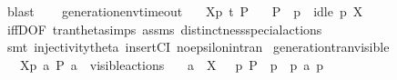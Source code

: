 \begin{isabellebody}
\ blast%
\endisatagproof
{\isafoldproof}%
%
\isadelimproof
\isanewline
%
\endisadelimproof
\ \ \isanewline
{}\isamarkupfalse%
\ generation{\isacharunderscore}{\kern0pt}env{\isacharunderscore}{\kern0pt}timeout{\isacharcolon}{\kern0pt}\isanewline
\ \ \ {\isacartoucheopen}{\isasymtheta}{\isacharbrackleft}{\kern0pt}X{\isacharbrackright}{\kern0pt}{\isacharparenleft}{\kern0pt}p{\isacharparenright}{\kern0pt}\ {\isasymlongmapsto}\isactrlsup {\isasymtheta}t{\isacharunderscore}{\kern0pt}{\isasymepsilon}\ P{\isacharprime}{\kern0pt}{\isacartoucheclose}\isanewline
\ \ \ {\isacartoucheopen}P{\isacharprime}{\kern0pt}\ {\isacharequal}{\kern0pt}\ {\isasymtheta}{\isacharparenleft}{\kern0pt}p{\isacharparenright}{\kern0pt}\ {\isasymand}\ idle\ p\ X{\isacartoucheclose}\isanewline
%
\isadelimproof
\ \ %
\endisadelimproof
%
\isatagproof
{}\isamarkupfalse%
\ iffD{}{\isacharbrackleft}{\kern0pt}OF\ tran{\isacharunderscore}{\kern0pt}theta{\isachardot}{\kern0pt}simps\ assms{\isacharbrackright}{\kern0pt}\ distinctness{\isacharunderscore}{\kern0pt}special{\isacharunderscore}{\kern0pt}actions\isanewline
\ \ \isamarkupfalse%
\ {\isacharparenleft}{\kern0pt}smt\ injectivity{\isacharunderscore}{\kern0pt}theta{\isacharparenleft}{\kern0pt}{}{\isacharparenright}{\kern0pt}\ insertCI\ no{\isacharunderscore}{\kern0pt}epsilon{\isacharunderscore}{\kern0pt}in{\isacharunderscore}{\kern0pt}tran{\isacharparenleft}{\kern0pt}{}{\isacharparenright}{\kern0pt}{\isacharparenright}{\kern0pt}{\isacharplus}{\kern0pt}%
\endisatagproof
{\isafoldproof}%
%
\isadelimproof
\isanewline
%
\endisadelimproof
\isanewline
{}\isamarkupfalse%
\ generation{\isacharunderscore}{\kern0pt}tran{\isacharunderscore}{\kern0pt}visible{\isacharcolon}{\kern0pt}\isanewline
\ \ \ {\isacartoucheopen}{\isasymtheta}{\isacharbrackleft}{\kern0pt}X{\isacharbrackright}{\kern0pt}{\isacharparenleft}{\kern0pt}p{\isacharparenright}{\kern0pt}\ {\isasymlongmapsto}\isactrlsup {\isasymtheta}a\ P{\isacharprime}{\kern0pt}{\isacartoucheclose}\ {\isacartoucheopen}a\ {\isasymin}\ visible{\isacharunderscore}{\kern0pt}actions{\isacartoucheclose}\isanewline
\ \ \ {\isacartoucheopen}a\ {\isasymin}\ X\ {\isasymand}\ {\isacharparenleft}{\kern0pt}{\isasymexists}\ p{\isacharprime}{\kern0pt}{\isachardot}{\kern0pt}\ P{\isacharprime}{\kern0pt}\ {\isacharequal}{\kern0pt}\ {\isasymtheta}{\isacharparenleft}{\kern0pt}p{\isacharprime}{\kern0pt}{\isacharparenright}{\kern0pt}\ {\isasymand}\ p\ {\isasymlongmapsto}a\ p{\isacharprime}{\kern0pt}{\isacharparenright}{\kern0pt}{\isacartoucheclose}\isanewline

\end{isabellebody}
